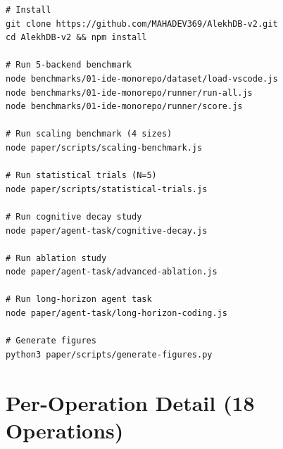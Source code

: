 \begin{verbatim}
# Install
git clone https://github.com/MAHADEV369/AlekhDB-v2.git
cd AlekhDB-v2 && npm install

# Run 5-backend benchmark
node benchmarks/01-ide-monorepo/dataset/load-vscode.js
node benchmarks/01-ide-monorepo/runner/run-all.js
node benchmarks/01-ide-monorepo/runner/score.js

# Run scaling benchmark (4 sizes)
node paper/scripts/scaling-benchmark.js

# Run statistical trials (N=5)
node paper/scripts/statistical-trials.js

# Run cognitive decay study
node paper/agent-task/cognitive-decay.js

# Run ablation study
node paper/agent-task/advanced-ablation.js

# Run long-horizon agent task
node paper/agent-task/long-horizon-coding.js

# Generate figures
python3 paper/scripts/generate-figures.py
\end{verbatim}

\section{Per-Operation Detail (18 Operations)}

